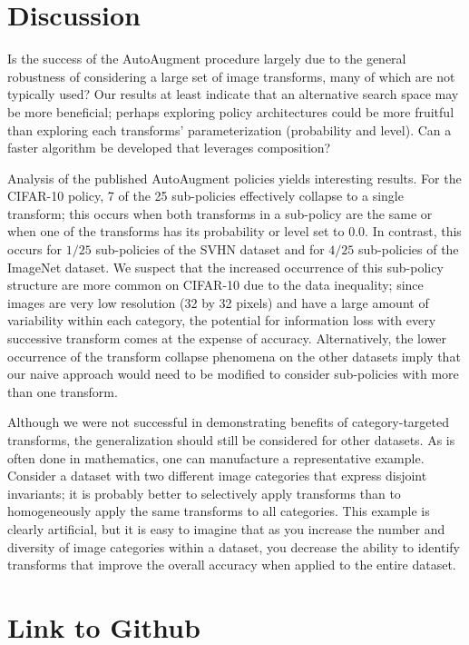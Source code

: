 \documentclass[10pt,twocolumn,letterpaper]{article}
\begin{document}
	
\section{Discussion}
	 
	Is the success of the AutoAugment procedure largely due to the general robustness of considering a large set of image transforms, many of which are not typically used? Our results at least indicate that an alternative search space may be more beneficial; perhaps exploring policy architectures could be more fruitful than exploring each transforms' parameterization (probability and level). Can a faster algorithm be developed that leverages composition?  
		 
	Analysis of the published AutoAugment policies yields interesting results. For the CIFAR-10 policy, 7 of the 25 sub-policies effectively collapse to a single transform; this occurs when both transforms in a sub-policy are the same or when one of the transforms has its probability or level set to $0.0$. In contrast, this occurs for $1/25$ sub-policies of the SVHN dataset and for $4/25$ sub-policies of the ImageNet dataset. We suspect that the increased occurrence of this sub-policy structure are more common on CIFAR-10 due to the data inequality; since images are very low resolution (32 by 32 pixels) and have a large amount of variability within each category, the potential for information loss with every successive transform comes at the expense of accuracy. Alternatively, the lower occurrence of the transform collapse phenomena on the other datasets imply that our naive approach would need to be modified to consider sub-policies with more than one transform. 
	
	Although we were not successful in demonstrating benefits of category-targeted transforms, the generalization should still be considered for other datasets. As is often done in mathematics, one can manufacture a representative example. Consider a dataset with two different image categories that express disjoint invariants; it is probably better to selectively apply transforms than to homogeneously apply the same transforms to all categories. This example is clearly artificial, but it is easy to imagine that as you increase the number and diversity of image categories within a dataset, you decrease the ability to identify transforms that improve the overall accuracy when applied to the entire dataset. 
	 


\section{Link to Github}
\end{document}
